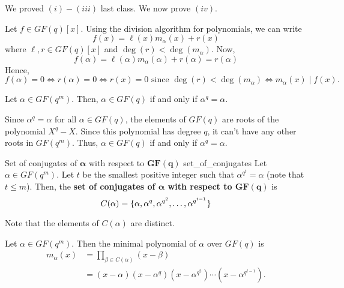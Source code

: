 We proved $ (i)-(iii) $ last class. We now prove $ (iv) $.
\begin{Proof}{}{}
    Let $ f\in GF(q)[x] $. Using the division algorithm for polynomials,
    we can write
    \[ f(x)=\ell(x)m_\alpha(x)+r(x) \]
    where $ \ell,r\in GF(q)[x] $ and $ \deg(r)<\deg(m_\alpha) $. Now,
    \[ f(\alpha)=\ell(\alpha)m_\alpha(\alpha)+r(\alpha)=r(\alpha) \]
    Hence,
    \[ f(\alpha)=0\iff r(\alpha)=0\iff r(x)=0 \text{ since }\deg(r)<\deg(m_\alpha)\iff
        m_\alpha(x)\mid f(x). \]
\end{Proof}

\begin{Theorem}{}{}
    Let $ \alpha\in GF(q^m) $. Then, $ \alpha\in GF(q) $ if and only if
    $ \alpha^q=\alpha $.
\end{Theorem}

\begin{Proof}{}{}
    Since $ \alpha^q=\alpha $ for all $ \alpha\in GF(q) $, the elements of $ GF(q) $
    are roots of the polynomial $ X^q-X $. Since this polynomial has degree $ q $,
    it can't have any other roots in $ GF(q^m) $. Thus, $ \alpha\in GF(q) $
    if and only if $ \alpha^q=\alpha $.
\end{Proof}

\begin{Definition}{Set of conjugates of $ \symbf{\alpha} $ with respect to $ \symbf{GF(q)} $}{
        set_of_conjugates
    }
    Let $ \alpha\in GF(q^m) $. Let $ t $ be the smallest positive integer such that
    $ \alpha^{q^t}=\alpha $ (note that $ t\leqslant m $). Then, the
    \textbf{set of conjugates of $ \symbf{\alpha} $ with respect to $ \symbf{GF(q)} $} is
    \[ C(\alpha)=\{\alpha,\alpha^q,\alpha^{q^2},\ldots,\alpha^{q^{t-1}}\} \]

    Note that the elements of $ C(\alpha) $ are distinct.
\end{Definition}

\begin{Theorem}{}{}
    Let $ \alpha\in GF(q^m) $. Then the minimal polynomial of $ \alpha $ over
    $ GF(q) $ is
    \begin{align*}
        m_\alpha(x)
         & =\prod_{\beta\in C(\alpha)}(x-\beta)                               \\
         & =(x-\alpha)(x-\alpha^q)(x-\alpha^{q^2})\cdots(x-\alpha^{q^{t-1}}).
    \end{align*}
\end{Theorem}

